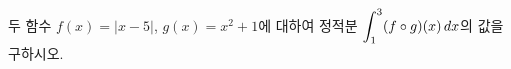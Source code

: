 두 함수 $f(x)=|x-5|$, $g(x)=x^2+1$에 대하여 정적분 $\displaystyle\int_{1}^{3} (f\circ g)(x)\mkern3mu dx$의 값을 구하시오.

